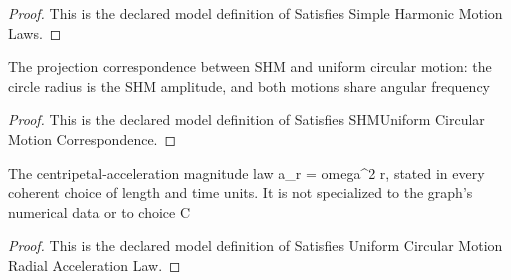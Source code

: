 \begin{proof}
  This is the declared model definition of Satisfies Simple Harmonic Motion Laws.
\end{proof}
\begin{definition}
  \label{def:physics:phyx-mini-0273:phyxminiproblems-problemphyxmini0273-satisfiesshmuniformcircularmotioncorrespondence}
  The projection correspondence between SHM and uniform circular motion: the circle radius is the SHM amplitude, and both motions share angular frequency
\end{definition}
\begin{proof}
  This is the declared model definition of Satisfies SHMUniform Circular Motion Correspondence.
\end{proof}
\begin{definition}
  \label{def:physics:phyx-mini-0273:phyxminiproblems-problemphyxmini0273-satisfiesuniformcircularmotionradialaccelerationlaw}
  The centripetal-acceleration magnitude law a\_r = omega\textasciicircum{}2 r, stated in every coherent choice of length and time units. It is not specialized to the graph's numerical data or to choice C
\end{definition}
\begin{proof}
  This is the declared model definition of Satisfies Uniform Circular Motion Radial Acceleration Law.
\end{proof}
